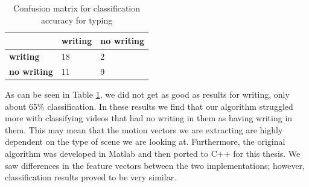 
\FloatBarrier

\begin{table}[h]
  \begin{centering}
  \begin{tabular}{| l | l | l |}
  \hline
   & \textbf{writing} & \textbf{no writing}\\ \hline
  \textbf{writing} & 18 & 2 \\ \hline
  \textbf{no writing} & 11 & 9 \\ \hline
  \end{tabular}
  \caption{Confusion matrix for classification accuracy for typing}
  \label{tab:writing_confusion}
\end{centering}
\end{table}

As can be seen in Table \ref{tab:writing_confusion}, we did not get as good
as results for writing, only about 65\% classification. In these results we
find that our algorithm struggled more with classifying videos that had no
writing in them as having writing in them. This may mean that the motion vectors
we are extracting are highly dependent on the type of scene we are looking at. Furthermore,
the original algorithm was developed in Matlab and then ported to C++ for this thesis. We
saw differences in the feature vectors between the two implementations; however,
classification results proved to be very similar.

